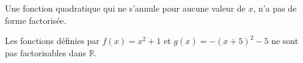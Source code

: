 \documentclass[main.tex]{subfiles}
\begin{document}
\begin{proposition} Une fonction quadratique qui ne s'annule pour aucune valeur de $x$, n'a pas de forme factorisée.
\end{proposition}
\begin{example} Les  fonctions définies par $f(x)=x^2+1$ et $g(x)=-(x+5)^2 - 5$ ne sont pas factorisables dans $\mathbb{R}$. 
\end{example}
%	 

\newpage 
{}  
\pagestyle{scrheadings} %
\onehalfspacing
\end{document}
